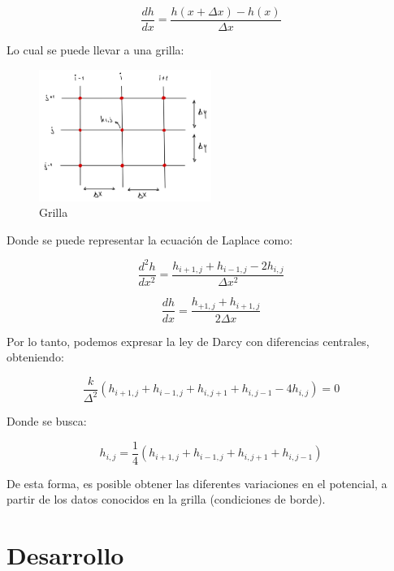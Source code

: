 \begin{equation}
    \frac{dh}{dx} = \frac{h(x + \Delta x) - h(x)}{\Delta x}
\end{equation}

Lo cual se puede llevar a una grilla:

\begin{figure}[H]
    \centering
    \includegraphics[width=0.5\textwidth]{FOTOS/grilla.jpg}
    \caption{Grilla}
\end{figure}

Donde se puede representar la ecuación de Laplace como:

\begin{equation}
    \frac{d^2h}{dx^2} = \frac{h_{i+1,j} + h_{i-1,j} - 2h_{i,j}}{\Delta x^2}
\end{equation}

\begin{equation}
    \frac{dh}{dx} = \frac{h_{+1,j} + h_{i+1,j}}{2\Delta x}
\end{equation}

Por lo tanto, podemos expresar la ley de Darcy con diferencias centrales, obteniendo:

\begin{equation}
    \frac{k}{\Delta^2}(h_{i+1,j} + h_{i-1,j} + h_{i,j+1} + h_{i,j-1} - 4h_{i,j}) = 0
\end{equation}

Donde se busca:

\begin{equation}
    h_{i,j} = \frac{1}{4}(h_{i+1,j} + h_{i-1,j} + h_{i,j+1} + h_{i,j-1})
\end{equation}

De esta forma, es posible obtener las diferentes variaciones en el potencial, a partir de los datos conocidos en la grilla (condiciones de borde).

\newpage
\section{Desarrollo}

